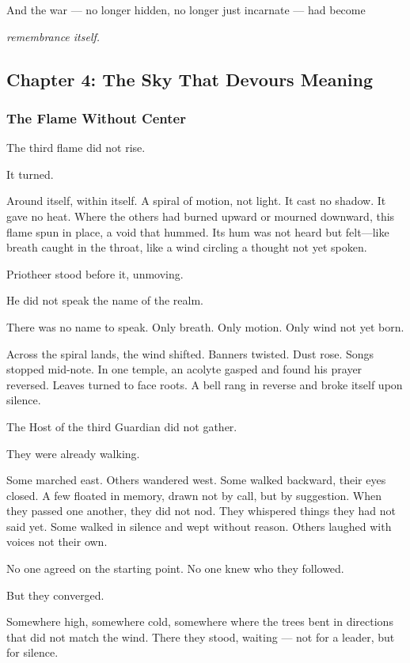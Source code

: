 \documentclass[12pt]{article}
\begin{document}
And the war — no longer hidden, no longer just incarnate — had become

\textit{remembrance itself.}

\newpage

\subsection*{Chapter 4: The Sky That Devours Meaning}

\vspace{.5in}

\subsubsection*{The Flame Without Center}

The third flame did not rise.

It turned.

Around itself, within itself. A spiral of motion, not light. It cast no shadow. It gave no heat. Where the others had burned upward or mourned downward, this flame spun in place, a void that hummed. Its hum was not heard but felt—like breath caught in the throat, like a wind circling a thought not yet spoken.

Priotheer stood before it, unmoving.

He did not speak the name of the realm.

There was no name to speak. Only breath. Only motion. Only wind not yet born.

Across the spiral lands, the wind shifted. Banners twisted. Dust rose. Songs stopped mid-note. In one temple, an acolyte gasped and found his prayer reversed. Leaves turned to face roots. A bell rang in reverse and broke itself upon silence.

The Host of the third Guardian did not gather.

They were already walking.

Some marched east. Others wandered west. Some walked backward, their eyes closed. A few floated in memory, drawn not by call, but by suggestion. When they passed one another, they did not nod. They whispered things they had not said yet. Some walked in silence and wept without reason. Others laughed with voices not their own.

No one agreed on the starting point. No one knew who they followed.

But they converged.

Somewhere high, somewhere cold, somewhere where the trees bent in directions that did not match the wind. There they stood, waiting — not for a leader, but for silence.
\end{document}
